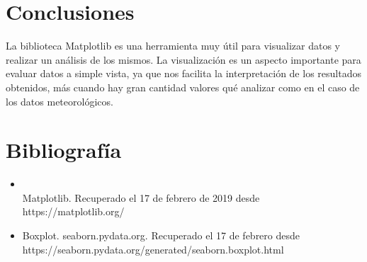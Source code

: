 \documentclass[letterpaper,12pt]{article}
\begin{document}
\section{Conclusiones}
La biblioteca Matplotlib es una herramienta muy útil para visualizar datos y realizar un análisis de los mismos. La visualización es un aspecto importante para evaluar datos a simple vista, ya que nos facilita la interpretación de los resultados obtenidos, más cuando hay gran cantidad valores qué analizar como en el caso de los datos meteorológicos. 

\section*{Bibliografía}
\begin{itemize}
\item \\Matplotlib. Recuperado el 17 de febrero de 2019 desde \\https://matplotlib.org/
\item Boxplot. seaborn.pydata.org. Recuperado el 17 de febrero desde\\       https://seaborn.pydata.org/generated/seaborn.boxplot.html
\end{itemize}
\end{document}
